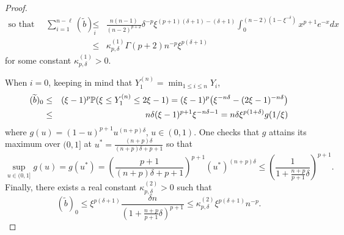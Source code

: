 \begin{proof}
\[\]
\begin{eqnarray*}
\mbox{so that  }\quad \sum_{i=1}^{n-\ell} (\widetilde b)_i & \le&   \frac{n(n-1)}{(n-2)^{p+2}} \delta^{-p} \xi^{(p+1)(\delta+1)-(\delta+1)} \int_0^{(n-2)(1-\xi^{-\delta})} x^{p+1} e^{-x}dx \\
&\le & \kappa^{(1)}_{p,\delta} \Gamma(p+2) n^{-p} \xi^{p(\delta+1)}
\end{eqnarray*}
for some constant $\kappa^{(1)}_{p,\delta} > 0$.

When $i=0$, keeping in mind that $Y^{(n)}_1 = \min_{1\le i\le n}Y_i$, 
\begin{eqnarray*}
(\widetilde b)_0& \le& (\xi-1)^p \mathbb{P}(\xi \le Y^{(n)}_1\le 2\xi-1)= (\xi-1)^p \big(\xi^{-n\delta}-(2\xi-1)^{-n\delta}\big) \\
&\le& n\delta (\xi-1)^{p+1} \xi^{-n\delta-1}=  n\delta \xi^{p(1+\delta)} g(1/\xi)
\end{eqnarray*}
where $g(u) = (1-u)^{p+1}u^{(n+p)\delta}$, $u\!\in (0,1)$. One checks that $g$ attains its maximum over $(0,1]$ at $u^*= \frac{(n+p)\delta}{(n+p)\delta +p+1}$
so that
\[
\sup_{u\in (0,1]}g(u) = g(u^*)= \left(\frac{p+1}{(n+p)\delta +p+1}\right)^{p+1}(u^*)^{(n+p)\delta} \le  \left(\frac{1}{1+\frac{n+p}{p+1}\delta }\right)^{p+1}.
\]
Finally, there exists a real constant $\kappa^{(2)}_{p,\delta}>0$ such that 
\[
(\widetilde b)_0 \le \xi^{p(\delta+1)} \frac{\delta n}{(1+\frac{n+p}{p+1}\delta)^{p+1}}\le \kappa^{(2)}_{p,\delta}  \xi^{p(\delta+1)}  n^{-p}.
\]


\end{proof}
